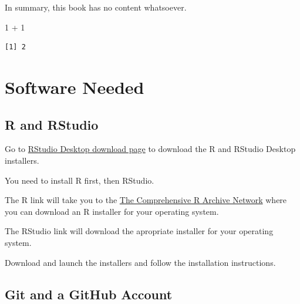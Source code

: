 \documentclass[
  letterpaper,
  DIV=11,
  numbers=noendperiod]{scrreprt}
\newenvironment{Shaded}{\begin{snugshade}}{\end{snugshade}}
\newcommand{\DecValTok}[1]{\textcolor[rgb]{0.68,0.00,0.00}{#1}}
\newcommand{\SpecialCharTok}[1]{\textcolor[rgb]{0.37,0.37,0.37}{#1}}
\begin{document}
In summary, this book has no content whatsoever.

\begin{Shaded}
\begin{Highlighting}[]
\DecValTok{1} \SpecialCharTok{+} \DecValTok{1}
\end{Highlighting}
\end{Shaded}

\begin{verbatim}
[1] 2
\end{verbatim}


\chapter{Software Needed}\label{sec-software-needed}

\section{R and RStudio}\label{r-and-rstudio}

Go to \href{https://posit.co/download/rstudio-desktop/}{RStudio Desktop
download page} to download the R and RStudio Desktop installers.

\begin{tcolorbox}[enhanced jigsaw, left=2mm, title=\textcolor{quarto-callout-note-color}{\faInfo}\hspace{0.5em}{Note}, opacityback=0, breakable, colbacktitle=quarto-callout-note-color!10!white, colframe=quarto-callout-note-color-frame, arc=.35mm, titlerule=0mm, leftrule=.75mm, opacitybacktitle=0.6, toptitle=1mm, colback=white, toprule=.15mm, bottomtitle=1mm, rightrule=.15mm, coltitle=black, bottomrule=.15mm]

You need to install R first, then RStudio.

\end{tcolorbox}

The R link will take you to the \href{https://cran.rstudio.com/}{The
Comprehensive R Archive Network} where you can download an R installer
for your operating system.

The RStudio link will download the apropriate installer for your
operating system.

Download and launch the installers and follow the installation
instructions.

\section{Git and a GitHub Account}\label{git-and-a-github-account}
\end{document}
